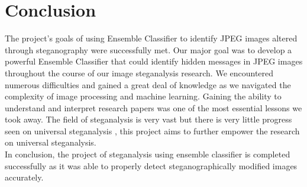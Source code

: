 \chapter{Conclusion}
The project's goals of using Ensemble Classifier to identify JPEG images altered through steganography were successfully met. Our major goal was to develop a powerful Ensemble Classifier that could identify hidden messages in JPEG images throughout the course of our image steganalysis research. We encountered numerous difficulties and gained a great deal of knowledge as we navigated the complexity of image processing and machine learning. Gaining the ability to understand and interpret research papers was one of the most essential lessons we took away. The field of steganalysis is very vast but there is very little progress seen on universal steganalysis , this project aims to further empower the research on universal steganalysis.\\
In conclusion, the project of steganalysis using ensemble classifier is completed successfully as it was able to properly detect steganographically modified images accurately.

\clearpage


